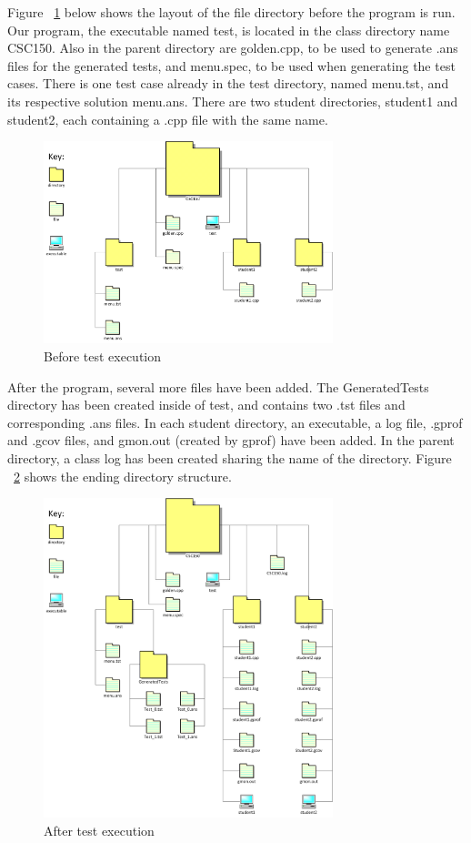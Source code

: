  Figure ~\ref{before} below shows the layout of the file directory before the program is run. Our program, the executable named test, is located in the class directory name CSC150. Also in the parent directory are golden.cpp, to be used to generate .ans files for the generated tests, and menu.spec, to be used when generating the test cases. There is one test case already in the test directory, named menu.tst, and its respective solution menu.ans. There are two student directories, student1 and student2, each containing a .cpp file with the same name. \\

\begin{figure}[tbh]
\begin{center}
\includegraphics[width=0.75\textwidth]{./before}
\end{center}
\caption{Before test execution \label{before}}
\end{figure}

After the program, several more files have been added. The GeneratedTests directory has been created inside of test, and contains two .tst files and corresponding .ans files. In each student directory, an executable, a log file, .gprof and .gcov files, and gmon.out (created by gprof) have been added. In the parent directory, a class log has been created sharing the name of the directory. Figure ~\ref{after} shows the ending directory structure.

\begin{figure}[tbh]
\begin{center}
\includegraphics[width=0.75\textwidth]{./after}
\end{center}
\caption{After test execution \label{after}}
\end{figure}